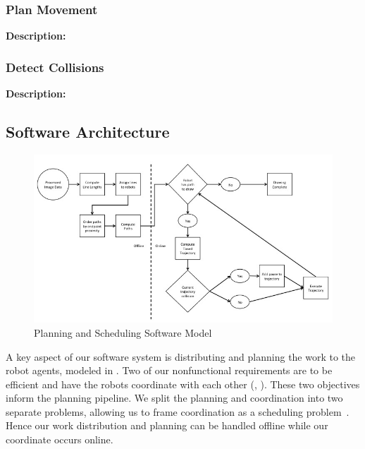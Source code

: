 \subsubsection{Plan Movement}
\textbf{Description:} 

\subsubsection{Detect Collisions}
\textbf{Description:} 

\subsection{Software Architecture}
\label{sec:sw_arch_planner}

\begin{figure}[!ht]
 \centering
  \includegraphics[width=0.99\columnwidth]{diagrams/sw_arch_planning.jpg}
	\caption{Planning and Scheduling Software Model}
 \label{fig:planning_processing}
\end{figure}

A key aspect of our software system is distributing and planning the work to the robot agents, modeled in .
Two of our nonfunctional requirements are to be efficient and have the robots coordinate with each other (, ). These two objectives inform the planning pipeline. We split the planning and coordination into two separate problems, allowing us to frame coordination as a scheduling problem~\cite{o1989deadlock}. Hence our work distribution and planning can be handled offline while our coordinate occurs online.


